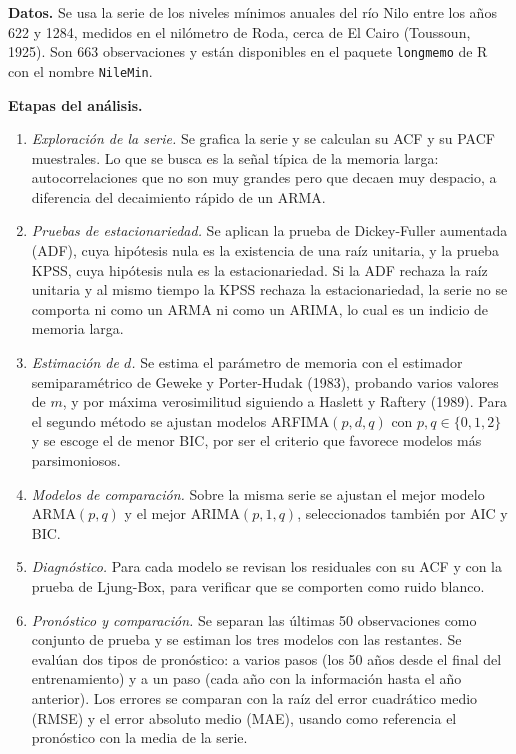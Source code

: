\documentclass[legalpaper,11pt]{article}
\begin{document}
\begin{enumerate}
\medskip
\noindent\textbf{Datos.} Se usa la serie de los niveles m\'inimos anuales del r\'io Nilo entre los a\~nos 622 y 1284, medidos en el nil\'ometro de Roda, cerca de El Cairo (Toussoun, 1925). Son 663 observaciones y est\'an disponibles en el paquete \texttt{longmemo} de R con el nombre \texttt{NileMin}.

\medskip
\noindent\textbf{Etapas del an\'alisis.}
\begin{enumerate}[label=\arabic*.]
\item \emph{Exploraci\'on de la serie.} Se grafica la serie y se calculan su ACF y su PACF muestrales. Lo que se busca es la se\~nal t\'ipica de la memoria larga: autocorrelaciones que no son muy grandes pero que decaen muy despacio, a diferencia del decaimiento r\'apido de un ARMA.
\newpage
\item \emph{Pruebas de estacionariedad.} Se aplican la prueba de Dickey-Fuller aumentada (ADF), cuya hip\'otesis nula es la existencia de una ra\'iz unitaria, y la prueba KPSS, cuya hip\'otesis nula es la estacionariedad. Si la ADF rechaza la ra\'iz unitaria y al mismo tiempo la KPSS rechaza la estacionariedad, la serie no se comporta ni como un ARMA ni como un ARIMA, lo cual es un indicio de memoria larga.
\item \emph{Estimaci\'on de $d$.} Se estima el par\'ametro de memoria con el estimador semiparam\'etrico de Geweke y Porter-Hudak (1983), probando varios valores de $m$, y por m\'axima verosimilitud siguiendo a Haslett y Raftery (1989). Para el segundo m\'etodo se ajustan modelos ARFIMA$(p,d,q)$ con $p,q \in \{0,1,2\}$ y se escoge el de menor BIC, por ser el criterio que favorece modelos m\'as parsimoniosos.
\item \emph{Modelos de comparaci\'on.} Sobre la misma serie se ajustan el mejor modelo ARMA$(p,q)$ y el mejor ARIMA$(p,1,q)$, seleccionados tambi\'en por AIC y BIC.
\item \emph{Diagn\'ostico.} Para cada modelo se revisan los residuales con su ACF y con la prueba de Ljung-Box, para verificar que se comporten como ruido blanco.
\item \emph{Pron\'ostico y comparaci\'on.} Se separan las \'ultimas 50 observaciones como conjunto de prueba y se estiman los tres modelos con las restantes. Se eval\'uan dos tipos de pron\'ostico: a varios pasos (los 50 a\~nos desde el final del entrenamiento) y a un paso (cada a\~no con la informaci\'on hasta el a\~no anterior). Los errores se comparan con la ra\'iz del error cuadr\'atico medio (RMSE) y el error absoluto medio (MAE), usando como referencia el pron\'ostico con la media de la serie.
\end{enumerate}


\end{enumerate}
\end{document}
